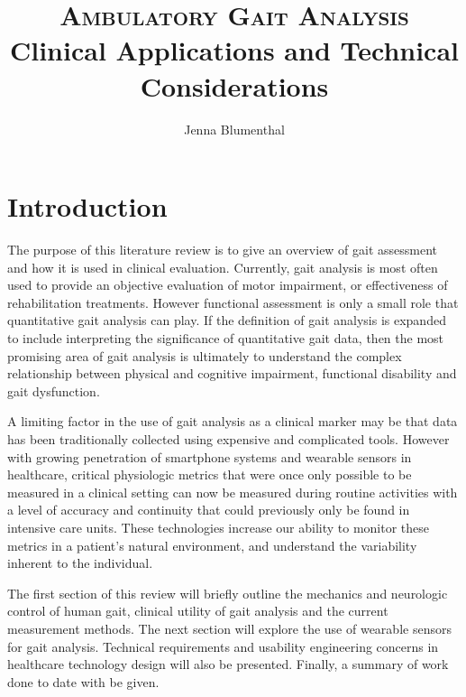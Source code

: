 \documentclass[11pt, oneside]{report}
\title{\textsc{\textbf{Ambulatory Gait Analysis}}\\ \vspace{5mm} \Large{Clinical Applications and Technical Considerations}
}
\author{Jenna Blumenthal}
\begin{document}

\maketitle
\renewcommand{\vspace}[2]{}%
\tableofcontents

\pagebreak

\section*{Introduction}

The purpose of this literature review is to give an overview of gait assessment and how it is used in clinical evaluation. Currently, gait analysis is most often used to provide an objective evaluation of motor impairment, or effectiveness of rehabilitation treatments. However functional assessment is only a small role that quantitative gait analysis can play. If the definition of gait analysis is expanded to include interpreting the significance of quantitative gait data, then the most promising area of gait analysis is ultimately to understand the complex relationship between physical and cognitive impairment, functional disability and gait dysfunction\cite{JoelA.DeLisa1998}.

A limiting factor in the use of gait analysis as a clinical marker may be that data has been traditionally collected using expensive and complicated tools. However with growing penetration of smartphone systems and wearable sensors in healthcare, critical physiologic metrics that were once only possible to be measured in a clinical setting can now be measured during routine activities with a level of accuracy and continuity that could previously only be found in intensive care units. These technologies increase our ability to monitor these metrics in a patient's natural environment, and understand the variability inherent to the individual.

The first section of this review will briefly outline the mechanics and neurologic control of human gait, clinical utility of gait analysis and the current measurement methods. The next section will explore the use of wearable sensors for gait analysis. Technical requirements and usability engineering concerns in healthcare technology design will also be presented. Finally, a summary of work done to date with be given.

\pagebreak
\end{document}
